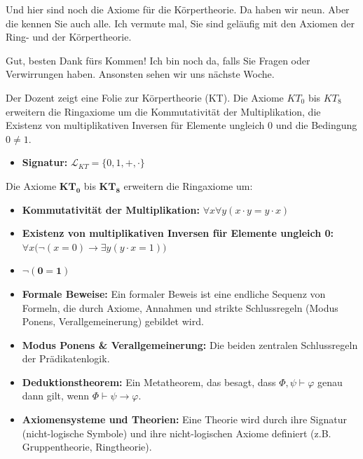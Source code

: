 \begin{spoken-clean}[01:29:17 - 01:30:08]
Und hier sind noch die Axiome für die Körpertheorie. Da haben wir neun. Aber die kennen Sie auch alle. Ich vermute mal, Sie sind geläufig mit den Axiomen der Ring- und der Körpertheorie.

Gut, besten Dank fürs Kommen! Ich bin noch da, falls Sie Fragen oder Verwirrungen haben. Ansonsten sehen wir uns nächste Woche.
\end{spoken-clean}

\begin{meta-note}
Der Dozent zeigt eine Folie zur Körpertheorie (KT).
Die Axiome $KT_0$ bis $KT_8$ erweitern die Ringaxiome um die Kommutativität der Multiplikation, die Existenz von multiplikativen Inversen für Elemente ungleich $0$ und die Bedingung $0 \neq 1$.
\end{meta-note}

\begin{math-stroke}
\begin{itemize}
    \item \textbf{Signatur:} $\mathcal{L}_{KT} = \{0, 1, +, \cdot\}$
\end{itemize}
Die Axiome $\mathbf{KT_0}$ bis $\mathbf{KT_8}$ erweitern die Ringaxiome um:
\begin{itemize}
    \item \textbf{Kommutativität der Multiplikation:} $\forall x \forall y (x \cdot y = y \cdot x)$
    \item \textbf{Existenz von multiplikativen Inversen für Elemente ungleich 0:} $\forall x \bigl(\neg(x = 0) \to \exists y (y \cdot x = 1)\bigr)$
    \item $\mathbf{\neg(0 = 1)}$
\end{itemize}
\end{math-stroke}

\begin{nice-box}
\begin{itemize}
    \item \textbf{Formale Beweise:} Ein formaler Beweis ist eine endliche Sequenz von Formeln, die durch Axiome, Annahmen und strikte Schlussregeln (Modus Ponens, Verallgemeinerung) gebildet wird.
    \item \textbf{Modus Ponens \& Verallgemeinerung:} Die beiden zentralen Schlussregeln der Prädikatenlogik.
    \item \textbf{Deduktionstheorem:} Ein Metatheorem, das besagt, dass $\Phi, \psi \vdash \varphi$ genau dann gilt, wenn $\Phi \vdash \psi \to \varphi$.
    \item \textbf{Axiomensysteme und Theorien:} Eine Theorie wird durch ihre Signatur (nicht-logische Symbole) und ihre nicht-logischen Axiome definiert (z.B. Gruppentheorie, Ringtheorie).
\end{itemize}
\end{nice-box}
